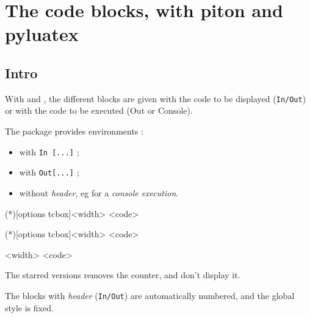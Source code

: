\documentclass[english,11pt,a4paper]{article}
\begin{document}
\pagebreak

\section{The code blocks, with piton and pyluatex}

\subsection{Intro}

With  and , the different blocks are given with the code to be displayed (\texttt{In/Out}) or with the code to be executed (\textsf{Out} or \textsf{Console}).

The package provides environments :

\begin{itemize}
	\item with \texttt{In~[...]} ;
	\item with \texttt{Out[...]} ;
	\item without \textit{header}, eg for a \textit{console execution}.
\end{itemize}

\begin{codehigh}[language=latex/latex2,style/main=cyan!10,style/code=cyan!10]
\begin{NotebookPitonIn}(*)[options tcbox]{<width>}
<code>
\end{NotebookPitonIn}
\end{codehigh}

\begin{codehigh}[language=latex/latex2,style/main=cyan!10,style/code=cyan!10]
\begin{NotebookPitonOut}(*)[options tcbox]{<width>}
<code>
\end{NotebookPitonOut}
\end{codehigh}

\begin{codehigh}[language=latex/latex2,style/main=cyan!10,style/code=cyan!10]
\begin{NotebookPitonConsole}{<width>}
<code>
\end{NotebookPitonConsole}
\end{codehigh}

The starred versions removes the counter, and don't display it.

The blocks with \textit{header} (\texttt{In/Out}) are automatically numbered, and the global style is fixed.
\end{document}
